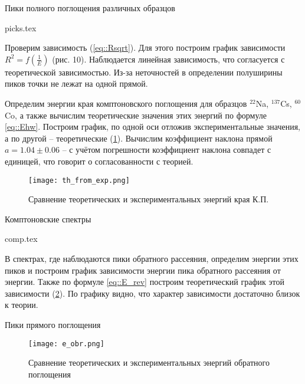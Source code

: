 \begin{table}[h]
\begin{center}
  \caption{Пики полного поглощения различных образцов}
  \label{tab:my_label}
  {picks.tex}
\end{center}
\end{table}

Проверим зависимость (\eqref{eq::Rsqrt}). Для этого построим график зависимости $R^2 = f(\frac{1}{E})$
(рис. 10). Наблюдается линейная зависимость, что согласуется с теоретической зависимостью. Из-за неточностей в определении
полуширины пиков точки не лежат на одной прямой.

Определим энергии края комптоновского поглощения для образцов $^{22}$Na,
$^{137}$Cs, $^{60}$Co, а также вычислим теоретические значения этих энергий по
формуле \eqref{eq::Ehw}. Построим график, по одной оси отложив экспериментальные
значения, а по другой -- теоретические (\ref{img::th_exp}). Вычислим коэффициент
наклона прямой $a = 1.04 \pm 0.06$ --  с учётом погрешности коэффициент наклона
совпадет с единицей, что говорит о согласованности с теорией.

\begin{figure}[h!]
  \centering
  \texttt{[image: th\_from\_exp.png]}
  \caption{Сравнение теоретических и экспериментальных энергий края К.П.}
  \label{img::th_exp}
\end{figure}

\begin{table}[h!]
  \begin{center}
    \caption{Комптоновские спектры}
    {comp.tex}
  \end{center}
\end{table}

В спектрах, где наблюдаются пики обратного рассеяния, определим энергии этих
пиков и построим график зависимости энергии пика обратного рассеяния от энергии.
Также по формуле \eqref{eq::E_rev} построим теоретический график этой
зависимости (\ref{img::e_obr}).
По графику видно, что характер зависимости достаточно близок к теории.
\begin{table}[h!]
  \centering
  \caption{Пики прямого поглощения}
  
\end{table}


\begin{figure}[h!]
  \centering
  \texttt{[image: e\_obr.png]}
  \caption{Сравнение теоретических и экспериментальных энергий обратного поглощения}
  \label{img::e_obr}
\end{figure}

